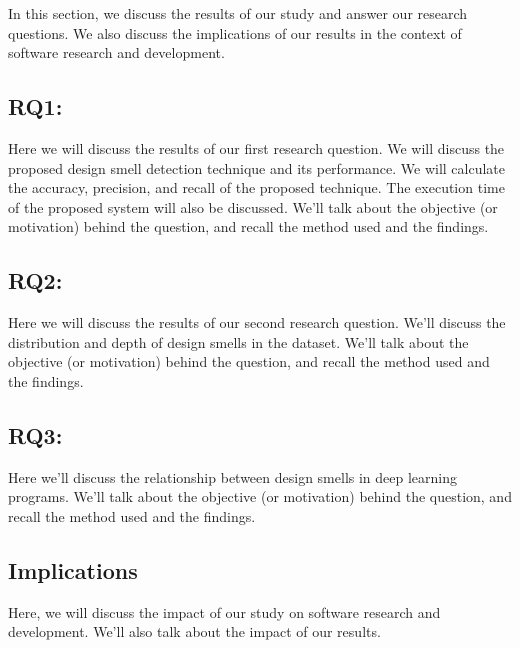 \label{sec:discussion}
In this section, we discuss the results of our study and answer our research questions. We also discuss the implications of our results in the context of software research and development.

\subsection{RQ1:\RQOne}
\label{rq1}

Here we will discuss the results of our first research question. We will discuss
the proposed design smell detection technique and its performance. We will
calculate the accuracy, precision, and recall of the proposed technique. The
execution time of the proposed system will also be discussed. We'll talk about
the objective (or motivation) behind the question, and recall the method used and the findings.





\subsection{RQ2:\RQTwo}
\label{rq2}

Here we will discuss the results of our second research question. We'll discuss the distribution and depth of design smells in the dataset. We'll talk about the objective (or motivation) behind the question, and recall the method used and the findings.



\subsection{RQ3:\RQThree}
\label{rq3}

Here we'll discuss the relationship between design smells in deep learning programs. We'll talk about the objective (or motivation) behind the question, and recall the method used and the findings.






\subsection{Implications}
\label{implications}
Here, we will discuss the impact of our study on software research and development. We'll also talk about the impact of our results.




